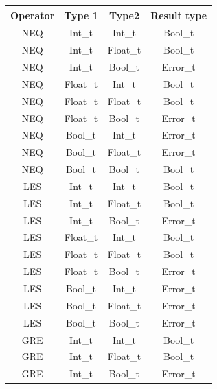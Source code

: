 \begin{figure}[H]
    \centering
    \begin{tabular}{cccc}
        \toprule
        \textbf{Operator} & \textbf{Type 1} & \textbf{Type2} & \textbf{Result type}\\
        \midrule NEQ & Int\_t & Int\_t      & Bool\_t \\
        \midrule NEQ & Int\_t & Float\_t    & Bool\_t \\
        \midrule NEQ & Int\_t & Bool\_t     & Error\_t \\

        \midrule NEQ & Float\_t & Int\_t    & Bool\_t \\
        \midrule NEQ & Float\_t & Float\_t  & Bool\_t \\
        \midrule NEQ & Float\_t & Bool\_t   & Error\_t \\

        \midrule NEQ & Bool\_t & Int\_t     & Error\_t \\
        \midrule NEQ & Bool\_t & Float\_t   & Error\_t \\
        \midrule NEQ & Bool\_t & Bool\_t    & Bool\_t \\

        \midrule LES & Int\_t & Int\_t      & Bool\_t \\
        \midrule LES & Int\_t & Float\_t    & Bool\_t \\
        \midrule LES & Int\_t & Bool\_t     & Error\_t \\

        \midrule LES & Float\_t & Int\_t    & Bool\_t \\
        \midrule LES & Float\_t & Float\_t  & Bool\_t \\
        \midrule LES & Float\_t & Bool\_t   & Error\_t \\

        \midrule LES & Bool\_t & Int\_t     & Error\_t \\
        \midrule LES & Bool\_t & Float\_t   & Error\_t \\
        \midrule LES & Bool\_t & Bool\_t    & Error\_t \\

        \midrule GRE & Int\_t & Int\_t      & Bool\_t \\
        \midrule GRE & Int\_t & Float\_t    & Bool\_t \\
        \midrule GRE & Int\_t & Bool\_t     & Error\_t \\


\end{tabular}
\end{figure}
